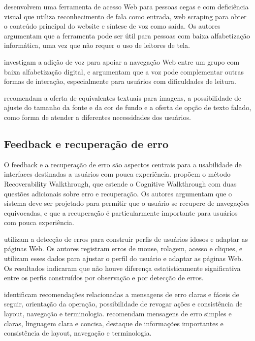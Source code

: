 \cite{kusumaningayu2017web} desenvolvem uma ferramenta de acesso Web para pessoas cegas e com deficiência visual que utiliza reconhecimento de fala como entrada, web scraping para obter o conteúdo principal do website e síntese de voz como saída. Os autores argumentam que a ferramenta pode ser útil para pessoas com baixa alfabetização informática, uma vez que não requer o uso de leitores de tela.

\cite{gautam2019adding} investigam a adição de voz para apoiar a navegação Web entre um grupo com baixa alfabetização digital, e argumentam que a voz pode complementar outras formas de interação, especialmente para usuários com dificuldades de leitura.

\cite{sun2010preliminary} recomendam a oferta de equivalentes textuais para imagens, a possibilidade de ajuste do tamanho da fonte e da cor de fundo e a oferta de opção de texto falado, como forma de atender a diferentes necessidades dos usuários.

\subsection{Feedback e recuperação de erro}

\label{sec:feedback}

O feedback e a recuperação de erro são aspectos centrais para a usabilidade de interfaces destinadas a usuários com pouca experiência. \cite{filgueiras2009recoverability} propõem o método Recoverability Walkthrough, que estende o Cognitive Walkthrough com duas questões adicionais sobre erro e recuperação. Os autores argumentam que o sistema deve ser projetado para permitir que o usuário se recupere de navegações equivocadas, e que a recuperação é particularmente importante para usuários com pouca experiência.

\cite{taylor2009using} utilizam a detecção de erros para construir perfis de usuários idosos e adaptar as páginas Web. Os autores registram erros de mouse, rolagem, acesso e cliques, e utilizam esses dados para ajustar o perfil do usuário e adaptar as páginas Web. Os resultados indicaram que não houve diferença estatisticamente significativa entre os perfis construídos por observação e por detecção de erros.

\cite{dombrovskaia2021guideline} identificam recomendações relacionadas a mensagens de erro claras e fáceis de seguir, orientação da operação, possibilidade de revogar ações e consistência de layout, navegação e terminologia. \cite{sun2010preliminary} recomendam mensagens de erro simples e claras, linguagem clara e concisa, destaque de informações importantes e consistência de layout, navegação e terminologia.


